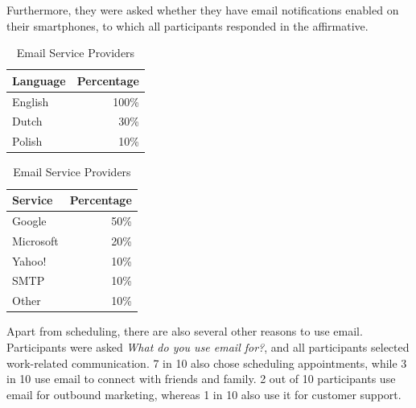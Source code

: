 \documentclass{article}
\begin{document}
Furthermore, they were asked whether they have email notifications enabled on their smartphones, to which all participants responded in the affirmative.

\begin{table}[!htb]
	\begin{minipage}{.5\linewidth}
		\caption{Email Languages}
		\centering
		\begin{tabular}{lr}
			\hline
			\textbf{Language} & \textbf{Percentage} \\
			\hline
			English           & 100\%               \\
			Dutch             & 30\%                \\
			Polish            & 10\%                \\
			\hline
		\end{tabular}
	\end{minipage}%
	\hspace{.1cm}
	\begin{minipage}{.5\linewidth}
		\centering
		\caption{Email Service Providers}
		\begin{tabular}{lr}
			\hline
			\textbf{Service} & \textbf{Percentage} \\
			\hline
			Google           & 50\%                \\
			Microsoft        & 20\%                \\
			Yahoo!           & 10\%                \\
			SMTP             & 10\%                \\
			Other            & 10\%                \\
			\hline
		\end{tabular}
	\end{minipage} 
\end{table}

Apart from scheduling, there are also several other reasons to use email. Participants were asked \emph{What do you use email for?}, and all participants selected work-related communication. 7 in 10 also chose scheduling appointments, while 3 in 10 use email to connect with friends and family. 2 out of 10 participants use email for outbound marketing, whereas 1 in 10 also use it for customer support.
\end{document}
